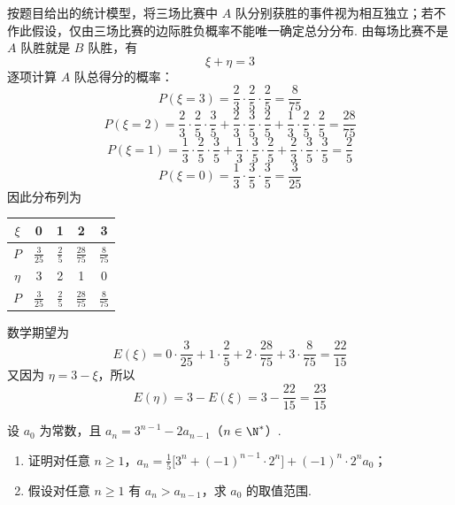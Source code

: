 \begin{solution}
按题目给出的统计模型，将三场比赛中 \(A\) 队分别获胜的事件视为相互独立；若不作此假设，仅由三场比赛的边际胜负概率不能唯一确定总分分布. 由每场比赛不是 \(A\) 队胜就是 \(B\) 队胜，有
\[
\xi+\eta=3
\]
逐项计算 \(A\) 队总得分的概率：
\[
P(\xi=3)=\frac{2}{3}\cdot\frac{2}{5}\cdot\frac{2}{5}=\frac{8}{75}
\]
\[
P(\xi=2)=\frac{2}{3}\cdot\frac{2}{5}\cdot\frac{3}{5}
+\frac{2}{3}\cdot\frac{3}{5}\cdot\frac{2}{5}
+\frac{1}{3}\cdot\frac{2}{5}\cdot\frac{2}{5}
=\frac{28}{75}
\]
\[
P(\xi=1)=\frac{1}{3}\cdot\frac{2}{5}\cdot\frac{3}{5}
+\frac{1}{3}\cdot\frac{3}{5}\cdot\frac{2}{5}
+\frac{2}{3}\cdot\frac{3}{5}\cdot\frac{3}{5}
=\frac{2}{5}
\]
\[
P(\xi=0)=\frac{1}{3}\cdot\frac{3}{5}\cdot\frac{3}{5}=\frac{3}{25}
\]
因此分布列为
\begin{center}
\begin{tabular}{c|cccc}
\hline
\(\xi\) & 0 & 1 & 2 & 3 \\
\hline
\(P\) & \(\frac{3}{25}\) & \(\frac{2}{5}\) & \(\frac{28}{75}\) & \(\frac{8}{75}\) \\
\hline
\(\eta\) & 3 & 2 & 1 & 0 \\
\hline
\(P\) & \(\frac{3}{25}\) & \(\frac{2}{5}\) & \(\frac{28}{75}\) & \(\frac{8}{75}\) \\
\hline
\end{tabular}
\end{center}

数学期望为
\[
E(\xi)=0\cdot\frac{3}{25}+1\cdot\frac{2}{5}+2\cdot\frac{28}{75}+3\cdot\frac{8}{75}
=\frac{22}{15}
\]
又因为 \(\eta=3-\xi\)，所以
\[
E(\eta)=3-E(\xi)=3-\frac{22}{15}=\frac{23}{15}
\]
\end{solution}

\begin{problem}
设 \(a_0\) 为常数，且 \(a_n = 3^{n-1} - 2a_{n-1}\)（\(n \in \N^*\)）.

\begin{enumerate}
\item 证明对任意 \(n \geqslant 1\)，\(a_n = \frac{1}{5} \bigl[3^n + (-1)^{n-1} \cdot 2^n\bigr] + (-1)^n \cdot 2^n a_0\)；
\item 假设对任意 \(n \geqslant 1\) 有 \(a_n > a_{n-1}\)，求 \(a_0\) 的取值范围.
\end{enumerate}
\end{problem}

